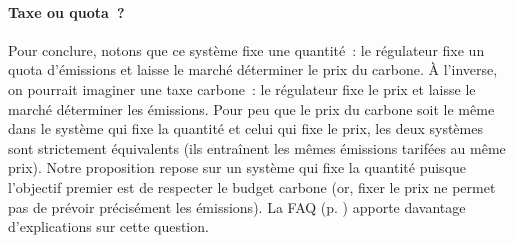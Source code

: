 \documentclass[a5paper,french,openany]{memoir}
\begin{document}

\paragraph{Taxe ou quota~?}
Pour conclure, notons que ce système fixe une quantité~: le régulateur fixe un quota d'émissions et laisse le marché déterminer le prix du carbone. À l'inverse, on pourrait imaginer une taxe carbone~: le régulateur fixe le prix et laisse le marché déterminer les émissions. Pour peu que le prix du carbone soit le même dans le système qui fixe la quantité et celui qui fixe le prix, les deux systèmes sont strictement équivalents (ils entraînent les mêmes émissions tarifées au même prix). Notre proposition repose sur un système qui fixe la quantité puisque l'objectif premier est de respecter le budget carbone (or, fixer le prix ne permet pas de prévoir précisément les émissions). La FAQ (p. \pageref{q:taxe}) apporte davantage d'explications sur cette question. 
\end{document}
